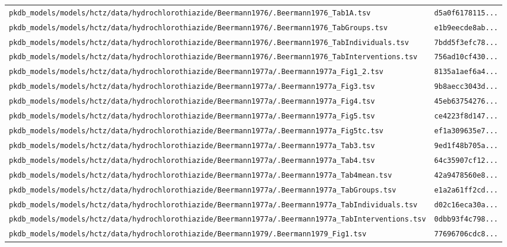 \begin{longtable}{ll}
\texttt{pkdb\_models/models/hctz/data/hydrochlorothiazide/Beermann1976/.Beermann1976\_Tab1A.tsv} & \texttt{d5a0f6178115...} \\
\texttt{pkdb\_models/models/hctz/data/hydrochlorothiazide/Beermann1976/.Beermann1976\_TabGroups.tsv} & \texttt{e1b9eecde8ab...} \\
\texttt{pkdb\_models/models/hctz/data/hydrochlorothiazide/Beermann1976/.Beermann1976\_TabIndividuals.tsv} & \texttt{7bdd5f3efc78...} \\
\texttt{pkdb\_models/models/hctz/data/hydrochlorothiazide/Beermann1976/.Beermann1976\_TabInterventions.tsv} & \texttt{756ad10cf430...} \\
\texttt{pkdb\_models/models/hctz/data/hydrochlorothiazide/Beermann1977a/.Beermann1977a\_Fig1\_2.tsv} & \texttt{8135a1aef6a4...} \\
\texttt{pkdb\_models/models/hctz/data/hydrochlorothiazide/Beermann1977a/.Beermann1977a\_Fig3.tsv} & \texttt{9b8aecc3043d...} \\
\texttt{pkdb\_models/models/hctz/data/hydrochlorothiazide/Beermann1977a/.Beermann1977a\_Fig4.tsv} & \texttt{45eb63754276...} \\
\texttt{pkdb\_models/models/hctz/data/hydrochlorothiazide/Beermann1977a/.Beermann1977a\_Fig5.tsv} & \texttt{ce4223f8d147...} \\
\texttt{pkdb\_models/models/hctz/data/hydrochlorothiazide/Beermann1977a/.Beermann1977a\_Fig5tc.tsv} & \texttt{ef1a309635e7...} \\
\texttt{pkdb\_models/models/hctz/data/hydrochlorothiazide/Beermann1977a/.Beermann1977a\_Tab3.tsv} & \texttt{9ed1f48b705a...} \\
\texttt{pkdb\_models/models/hctz/data/hydrochlorothiazide/Beermann1977a/.Beermann1977a\_Tab4.tsv} & \texttt{64c35907cf12...} \\
\texttt{pkdb\_models/models/hctz/data/hydrochlorothiazide/Beermann1977a/.Beermann1977a\_Tab4mean.tsv} & \texttt{42a9478560e8...} \\
\texttt{pkdb\_models/models/hctz/data/hydrochlorothiazide/Beermann1977a/.Beermann1977a\_TabGroups.tsv} & \texttt{e1a2a61ff2cd...} \\
\texttt{pkdb\_models/models/hctz/data/hydrochlorothiazide/Beermann1977a/.Beermann1977a\_TabIndividuals.tsv} & \texttt{d02c16eca30a...} \\
\texttt{pkdb\_models/models/hctz/data/hydrochlorothiazide/Beermann1977a/.Beermann1977a\_TabInterventions.tsv} & \texttt{0dbb93f4c798...} \\
\texttt{pkdb\_models/models/hctz/data/hydrochlorothiazide/Beermann1979/.Beermann1979\_Fig1.tsv} & \texttt{77696706cdc8...} \\

\end{longtable}
